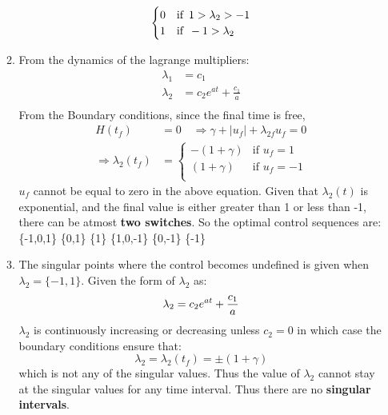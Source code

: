 \begin{enumerate}
\begin{enumerate}
\begin{align*}
\begin{cases}
                      0 & \mbox{if}\enskip 1 > \lambda_2 > -1\\
                      1 & \mbox{if}\enskip -1 > \lambda_2 \\
                     \end{cases}
   \end{align*}
   \item From the dynamics of the lagrange multipliers:
   \begin{align*}
    \lambda_1 &= c_1\\
    \lambda_2 &= c_2 e^{at} + \frac{c_1}{a}\\
   \end{align*}
   From the Boundary conditions, since the final time is free,
   \begin{align*}
    H(t_f) &= 0 \quad \Rightarrow \gamma + |u_f| + \lambda_{2f} u_f = 0\\
    \Rightarrow \lambda_2(t_f) &= \begin{cases}
                                  -(1+\gamma) &\mbox{if } u_f = 1 \\
                                  (1+\gamma) & \mbox{if } u_f = -1\\
                                 \end{cases}
   \end{align*}
   $u_f$ cannot be equal to zero in the above equation. Given that $\lambda_2(t)$ is exponential,
and the final value is either greater than 1 or less than -1, there can be atmost \textbf{two
switches}. So the optimal control sequences are: \{-1,0,1\} \{0,1\} \{1\} \{1,0,-1\} \{0,-1\} \{-1\}
 
   \item The singular points where the control becomes undefined is given when $\lambda_2 =
\{-1,1\}$. Given the form of $\lambda_2$ as:
   \begin{equation*}
    \lambda_2 = c_2 e^{at} + \frac{c_1}{a}\\
   \end{equation*}
  $\lambda_2$ is continuously increasing or decreasing unless $c_2 = 0$ in which case the boundary
conditions ensure that:
  \begin{equation*}
   \lambda_2 = \lambda_2(t_f) = \pm (1 + \gamma)
  \end{equation*}
  which is not any of the singular values. Thus the value of $\lambda_2$ cannot stay at the singular
values for any time interval. Thus there are no \textbf{singular intervals}.
  

\end{enumerate}
\end{enumerate}
